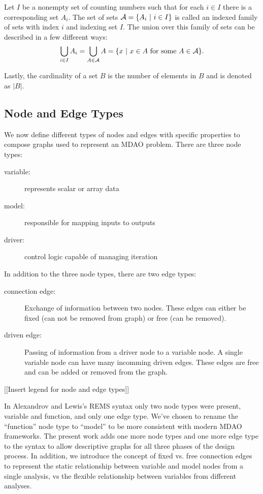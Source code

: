   Let $I$ be a nonempty set of counting numbers such that for each $i \in I$ there is a corresponding set $A_i$. 
  The set of sets $\mathcal A = \{A_i \ | \  i \in I\}$ is called an indexed family of sets with index $i$ and 
  indexing set $I$\cite{smith2006}. 
  The union over this family of sets can be described in a few different ways:
  \begin{equation}
  \bigcup_{i \in I} A_i = \bigcup_{A \in \mathcal A} A = \{x \ | \  x \in A \textrm{ for some } A \in \mathcal A\}.
  \end{equation}

  Lastly, the cardinality of a set $B$ is the number of elements in $B$ and is denoted as $|B|$.

\subsection{Node and Edge Types}
  \label{ss:types}
  We now define different types of nodes and edges with specific properties to compose graphs used to represent an MDAO problem. 
  There are three node types:  
  \begin{description}
    \item[variable:] represents scalar or array data
    \item[model:] responsible for mapping inputs to outputs
    \item[driver:] control logic capable of managing iteration
  \end{description}

  In addition to the three node types, there are two edge types: 

  \begin{description}
  \item[connection edge:] Exchange of information between two nodes. These edges 
  can either be fixed (can not be removed from graph) or free (can be removed). 
  \item [driven edge:] Passing of information from a driver node to a 
    variable node. A single variable node can have many incomming driven edges. These edges are 
    free and can be added or removed from the graph. 
  \end{description}

  [[Insert legend for node and edge types]]

  In Alexandrov and Lewis's REMS syntax only two node types were present, variable 
  and function, and only one edge type\cite{alexandrov2004}. We've chosen to rename the ``function'' node 
  type to ``model'' to be more consistent with modern MDAO frameworks. The present work 
  adds one more node types and one more edge type to the syntax to allow descriptive
  graphs for all three phases of the design process. In addition, we introduce the 
  concept of fixed vs. free connection edges to represent the
  static relationship between variable and model nodes from a single analysis, 
  vs the flexible relationship between variables from different analyses. 

